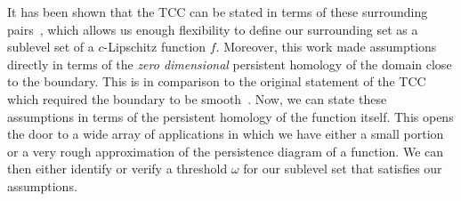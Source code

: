It has been shown that the TCC can be stated in terms of these surrounding pairs~\cite{cavanna2017when}, which allows us enough flexibility to define our surrounding set as a sublevel set of a $c$-Lipschitz function $f$.
Moreover, this work made assumptions directly in terms of the \emph{zero dimensional} persistent homology of the domain close to the boundary.
This is in comparison to the original statement of the TCC which required the boundary to be smooth~\cite{desilva07coverage}.
Now, we can state these assumptions in terms of the persistent homology of the function itself.
%
%
This opens the door to a wide array of applications in which we have either a small portion or a very rough approximation of the persistence diagram of a function.
We can then either identify or verify a threshold $\omega$ for our sublevel set that satisfies our assumptions.
